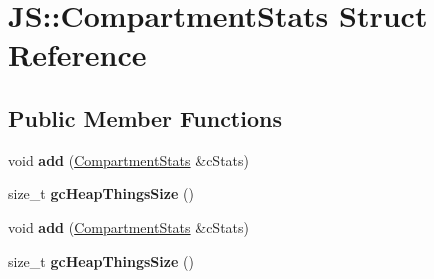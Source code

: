 \hypertarget{struct_j_s_1_1_compartment_stats}{\section{J\-S\-:\-:Compartment\-Stats Struct Reference}
\label{struct_j_s_1_1_compartment_stats}
}
\subsection*{Public Member Functions}
\begin{DoxyCompactItemize}
\item 
\hypertarget{struct_j_s_1_1_compartment_stats_ad31b06d61eee26e5cafe46abd712500a}{void {\bfseries add} (\hyperlink{struct_j_s_1_1_compartment_stats}{Compartment\-Stats} \&c\-Stats)}\label{struct_j_s_1_1_compartment_stats_ad31b06d61eee26e5cafe46abd712500a}

\item 
\hypertarget{struct_j_s_1_1_compartment_stats_afd134abe0a043cd1adea291a2f18500c}{size\-\_\-t {\bfseries gc\-Heap\-Things\-Size} ()}\label{struct_j_s_1_1_compartment_stats_afd134abe0a043cd1adea291a2f18500c}

\item 
\hypertarget{struct_j_s_1_1_compartment_stats_ad31b06d61eee26e5cafe46abd712500a}{void {\bfseries add} (\hyperlink{struct_j_s_1_1_compartment_stats}{Compartment\-Stats} \&c\-Stats)}\label{struct_j_s_1_1_compartment_stats_ad31b06d61eee26e5cafe46abd712500a}

\item 
\hypertarget{struct_j_s_1_1_compartment_stats_afd134abe0a043cd1adea291a2f18500c}{size\-\_\-t {\bfseries gc\-Heap\-Things\-Size} ()}\label{struct_j_s_1_1_compartment_stats_afd134abe0a043cd1adea291a2f18500c}

\end{DoxyCompactItemize}
